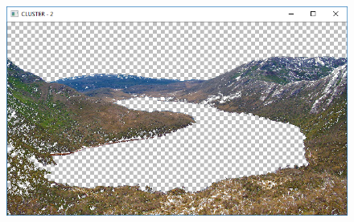\documentclass[czech, master, public, dept460, male, cpdeclaration, oneside]{diploma}
\begin{document}
\begin{figure}[H]
	\vspace*{+3.0mm}
	\centering
	\includegraphics[width=13cm]{Figures/results/euclidean/img1/cluster2.png}
\end{figure}
\end{document}
